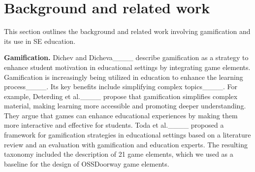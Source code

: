 \section{Background and related work}
\label{sec:backrelated}

This section outlines the background and related work involving gamification and its use in SE education.


\textbf{Gamification.} Dichev and Dicheva____ describe gamification as a strategy to enhance student motivation in educational settings by integrating game elements. Gamification is increasingly being utilized in education to enhance the learning process____. Its key benefits include simplifying complex topics____. For example, Deterding et al.____ propose that gamification simplifies complex material, making learning more accessible and promoting deeper understanding. They argue that games can enhance educational experiences by making them more interactive and effective for students. %
Toda et al.____ proposed a framework for gamification strategies in educational settings based on a literature review and an evaluation with gamification and education experts. The resulting taxonomy included the description of 21 game elements, which we used as a baseline for the design of OSSDoorway game elements.

